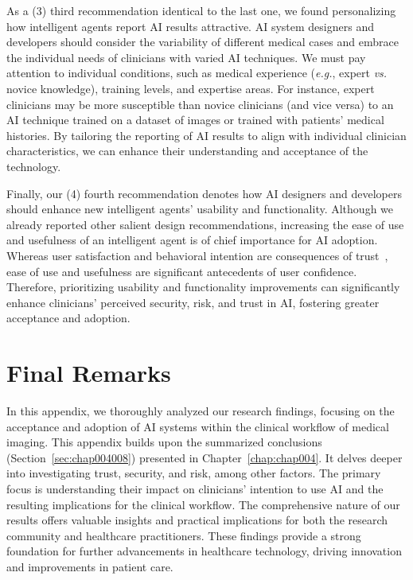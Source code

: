 As a (3) third recommendation identical to the last one, we found personalizing how intelligent agents report \ac{AI} results attractive.
\ac{AI} system designers and developers should consider the variability of different medical cases and embrace the individual needs of clinicians with varied \ac{AI} techniques.
We must pay attention to individual conditions, such as medical experience ({\it e.g.}, expert {\it vs.} novice knowledge), training levels, and expertise areas.
For instance, expert clinicians may be more susceptible than novice clinicians (and vice versa) to an \ac{AI} technique trained on a dataset of images or trained with patients' medical histories.
By tailoring the reporting of \ac{AI} results to align with individual clinician characteristics, we can enhance their understanding and acceptance of the technology.

Finally, our (4) fourth recommendation denotes how \ac{AI} designers and developers should enhance new intelligent agents' usability and functionality.
Although we already reported other salient design recommendations, increasing the ease of use and usefulness of an intelligent agent is of chief importance for \ac{AI} adoption.
Whereas user satisfaction and behavioral intention are consequences of trust~\cite{LIU2022107026, LV2022106993}, ease of use and usefulness are significant antecedents of user confidence.
Therefore, prioritizing usability and functionality improvements can significantly enhance clinicians' perceived security, risk, and trust in \ac{AI}, fostering greater acceptance and adoption.

\section{Final Remarks}
\label{chap:app003006}

In this appendix, we thoroughly analyzed our research findings, focusing on the acceptance and adoption of \ac{AI} systems within the clinical workflow of medical imaging.
This appendix builds upon the summarized conclusions (Section~\ref{sec:chap004008}) presented in Chapter~\ref{chap:chap004}.
It delves deeper into investigating trust, security, and risk, among other factors.
The primary focus is understanding their impact on clinicians' intention to use \ac{AI} and the resulting implications for the clinical workflow.
The comprehensive nature of our results offers valuable insights and practical implications for both the research community and healthcare practitioners.
These findings provide a strong foundation for further advancements in healthcare technology, driving innovation and improvements in patient care.

